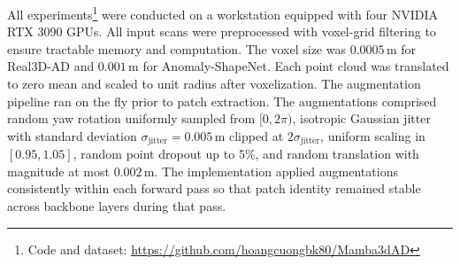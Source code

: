 All experiments\footnote{Code and dataset: \url{https://github.com/hoangcuongbk80/Mamba3dAD}} were conducted on a workstation equipped with four NVIDIA RTX 3090 GPUs. All input scans were preprocessed with voxel-grid filtering to ensure tractable memory and computation. The voxel size was \(0.0005\,\mathrm{m}\) for Real3D-AD and \(0.001\,\mathrm{m}\) for Anomaly-ShapeNet. Each point cloud was translated to zero mean and scaled to unit radius after voxelization. The augmentation pipeline ran on the fly prior to patch extraction. The augmentations comprised random yaw rotation uniformly sampled from \([0,2\pi)\), isotropic Gaussian jitter with standard deviation \(\sigma_{\mathrm{jitter}}=0.005\,\mathrm{m}\) clipped at \(2\sigma_{\mathrm{jitter}}\), uniform scaling in \([0.95,1.05]\), random point dropout up to \(5\%\), and random translation with magnitude at most \(0.002\,\mathrm{m}\). The implementation applied augmentations consistently within each forward pass so that patch identity remained stable across backbone layers during that pass.

